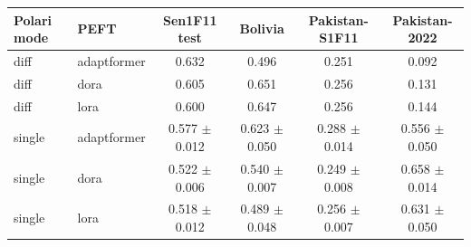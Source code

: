 \begin{tabular}{llcccc}
\toprule
Polari mode & PEFT & Sen1F11 test & Bolivia & Pakistan-S1F11 & Pakistan-2022 \\
\midrule
diff & adaptformer & 0.632 & 0.496 & 0.251 & 0.092 \\
diff & dora & 0.605 & 0.651 & 0.256 & 0.131 \\
diff & lora & 0.600 & 0.647 & 0.256 & 0.144 \\
single & adaptformer & 0.577 $\pm$ 0.012 & 0.623 $\pm$ 0.050 & 0.288 $\pm$ 0.014 & 0.556 $\pm$ 0.050 \\
single & dora & 0.522 $\pm$ 0.006 & 0.540 $\pm$ 0.007 & 0.249 $\pm$ 0.008 & 0.658 $\pm$ 0.014 \\
single & lora & 0.518 $\pm$ 0.012 & 0.489 $\pm$ 0.048 & 0.256 $\pm$ 0.007 & 0.631 $\pm$ 0.050 \\
\bottomrule
\end{tabular}
